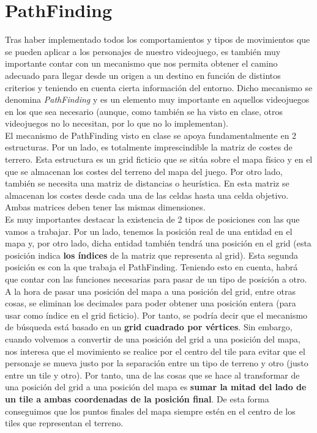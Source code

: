 \medskip
\section{PathFinding}

Tras haber implementado todos los comportamientos y tipos de movimientos que se pueden aplicar a los personajes de nuestro videojuego, es también muy importante contar con un mecanismo que nos permita obtener el camino adecuado para llegar desde un origen a un destino en función de distintos criterios y teniendo en cuenta cierta información del entorno. Dicho mecanismo se denomina \textit{PathFinding} y es un elemento muy importante en aquellos videojuegos en los que sea necesario (aunque, como también se ha visto en clase, otros videojuegos no lo necesitan, por lo que no lo implementan). \\

El mecanismo de PathFinding visto en clase se apoya fundamentalmente en 2 estructuras. Por un lado, es totalmente imprescindible la matriz de costes de terrero. Esta estructura es un grid ficticio que se sitúa sobre el mapa físico y en el que se almacenan los costes del terreno del mapa del juego. Por otro lado, también se necesita una matriz de distancias o heurística. En esta matriz se almacenan los costes desde cada una de las celdas hasta una celda objetivo. Ambas matrices deben tener las mismas dimensiones. \\

Es muy importantes destacar la existencia de 2 tipos de posiciones con las que vamos a trabajar. Por un lado, tenemos la posición real de una entidad en el mapa y, por otro lado, dicha entidad también tendrá una posición en el grid (esta posición indica \textbf{los índices} de la matriz que representa al grid). Esta segunda posición es con la que trabaja el PathFinding. Teniendo esto en cuenta, habrá que contar con las funciones necesarias para pasar de un tipo de posición a otro. \\

A la hora de pasar una posición del mapa a una posición del grid, entre otras cosas, se eliminan los decimales para poder obtener una posición entera (para usar como índice en el grid ficticio). Por tanto, se podría decir que el mecanismo de búsqueda está basado en un \textbf{grid cuadrado por vértices}. Sin embargo, cuando volvemos a convertir de una posición del grid a una posición del mapa, nos interesa que el movimiento se realice por el centro del tile para evitar que el personaje se mueva justo por la separación entre un tipo de terreno y otro (justo entre un tile y otro). Por tanto, una de las cosas que se hace al transformar de una posición del grid a una posición del mapa es \textbf{sumar la mitad del lado de un tile a ambas coordenadas de la posición final}. De esta forma conseguimos que los puntos finales del mapa siempre estén en el centro de los tiles que representan el terreno. \\

